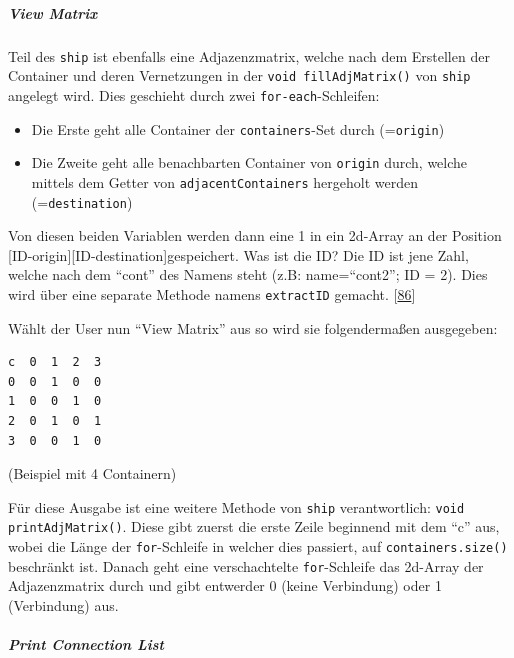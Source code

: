 \documentclass[
    headings=optiontotocandhead,%
    twoside,
    numbers=noenddot,%
    12pt, %
    titlepage, %
    parskip=full, %
    listof=leveldown, 
    numbers=noenddot, %
    a4paper,DIV=14,
    BCOR=15mm,
]{scrbook}
\newcommand{\passthrough}[1]{#1}
\providecommand{\tightlist}{%
  \setlength{\itemsep}{0pt}\setlength{\parskip}{0pt}}
\begin{document}
\hypertarget{view-matrix}{%
\subparagraph{View Matrix}\label{view-matrix}}

Teil des \passthrough{\lstinline!ship!} ist ebenfalls eine
Adjazenzmatrix, welche nach dem Erstellen der Container und deren
Vernetzungen in der \passthrough{\lstinline!void fillAdjMatrix()!} von
\passthrough{\lstinline!ship!} angelegt wird. Dies geschieht durch zwei
\passthrough{\lstinline!for-each!}-Schleifen:

\begin{itemize}
\tightlist
\item
  Die Erste geht alle Container der
  \passthrough{\lstinline!containers!}-Set durch
  (=\passthrough{\lstinline!origin!})
\item
  Die Zweite geht alle benachbarten Container von
  \passthrough{\lstinline!origin!} durch, welche mittels dem Getter von
  \passthrough{\lstinline!adjacentContainers!} hergeholt werden
  (=\passthrough{\lstinline!destination!})
\end{itemize}

Von diesen beiden Variablen werden dann eine 1 in ein 2d-Array an der
Position {[}ID-origin{]}{[}ID-destination{]}gespeichert. Was ist die ID?
Die ID ist jene Zahl, welche nach dem ``cont'' des Namens steht (z.B:
name=``cont2''; ID = 2). Dies wird über eine separate Methode namens
\passthrough{\lstinline!extractID!} gemacht.
{[}\protect\hyperlink{ref-gpt-IdExtractor}{86}{]}

Wählt der User nun ``View Matrix'' aus so wird sie folgendermaßen
ausgegeben:

\begin{lstlisting}[caption={Ausgabe der Adjazenzmatrix in der Konsole}]
c  0  1  2  3
0  0  1  0  0 
1  0  0  1  0 
2  0  1  0  1 
3  0  0  1  0 
\end{lstlisting}

(Beispiel mit 4 Containern)

Für diese Ausgabe ist eine weitere Methode von
\passthrough{\lstinline!ship!} verantwortlich:
\passthrough{\lstinline!void printAdjMatrix()!}. Diese gibt zuerst die
erste Zeile beginnend mit dem ``c'' aus, wobei die Länge der
\passthrough{\lstinline!for!}-Schleife in welcher dies passiert, auf
\passthrough{\lstinline!containers.size()!} beschränkt ist. Danach geht
eine verschachtelte \passthrough{\lstinline!for!}-Schleife das 2d-Array
der Adjazenzmatrix durch und gibt entwerder 0 (keine Verbindung) oder 1
(Verbindung) aus.

\hypertarget{print-connection-list}{%
\subparagraph{Print Connection List}\label{print-connection-list}}
\end{document}
